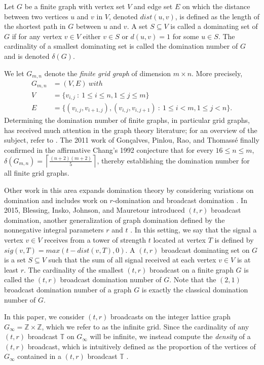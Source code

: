 \documentclass[12pt]{amsart}
\newcounter{x}
\newcounter{y}
\newcounter{x2}
\newcounter{y2}
\newcommand{\T}{
    \mathbb{T}
}
\begin{document}
Let $G$ be a finite graph with vertex set $V$ and edge set $E$ on which the distance between two vertices $u$ and $v$ in $V$, denoted $dist(u,v)$, is defined as the length of the shortest path in $G$ between $u$ and $v$. A set $S\subseteq V$ is called a dominating set of $G$ if for any vertex $v\in V$ either $v\in S$ or $d(u,v)=1$ for some $u\in S$. The cardinality of a smallest dominating set is called the domination number of $G$ and is denoted $\delta(G)$.

We let $G_{m,n}$ denote the \emph{finite grid graph} of dimension $m\times n$. More precisely,
\begin{align*}
G_{m,n} &= (V,E) \ with \\
V &= \{v_{i, j} \ :\ 1\leq i\leq n, 1\leq j\leq m\} \\
E &= \{(v_{i,j}, v_{i+1,j}), (v_{i,j}, v_{i,j+1}) \ :\ 1 \leq i < m, 1 \leq j < n \}.
\end{align*}
Determining the domination number of finite graphs, in particular grid graphs, has received much attention in the graph theory literature; for an overview of the subject, refer to \cite{haynes1998fundamentals}. The 2011 work of Gon{\c{c}}alves, Pinlou, Rao, and Thomass{\'e} \cite{gonccalves2011domination} finally confirmed in the affirmative Chang's 1992 conjecture \cite{chang1992domination} that for every $16 \leq n \leq m$, 
$ \delta(G_{m,n}) = \left \lceil{\frac{(n+2)(m+2)}{5}}\right \rceil$,
thereby establishing the domination number for all finite grid graphs.

Other work in this area expands domination theory by considering variations on domination and includes work on $r$-domination and broadcast domination \cite{dunbar2006broadcasts, griggs1992r}. In 2015, Blessing, Insko, Johnson, and Mauretour introduced $(t,r)$ broadcast domination, another generalization of graph domination defined by the nonnegative integral parameters $r$ and $t$ \cite{blessing2015t}. In this setting, we say that the signal a vertex $v\in V$ receives from a tower of strength $t$ located at vertex $T$ is defined by $sig(v,T)=max(t-dist(v,T),0)$. A $(t,r)$ broadcast dominating set on $G$ is a set $S\subseteq V$ such that the sum of all signal received at each vertex $v \in V$ is at least $r$. The cardinality of the smallest $(t,r)$ broadcast on a finite graph $G$ is called the $(t,r)$ broadcast domination number of $G$. Note that the $(2,1)$ broadcast domination number of a graph $G$ is exactly the classical domination number of $G$.

In this paper, we consider $(t,r)$ broadcasts on the integer lattice graph $G_{\infty}=\mathbb{Z}\times\mathbb{Z}$, which we refer to as the infinite grid. Since the cardinality of any $(t,r)$ broadcast $\T$ on $G_\infty$ will be infinite, we instead compute the \emph{density} of a $(t,r)$ broadcast, which is intuitively defined as the proportion of the vertices of $G_{\infty}$ contained in a $(t,r)$ broadcast $\T$ \cite{DHR}.
\end{document}

